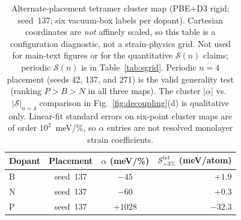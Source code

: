 \begin{table}[t]
\caption{\label{tab:placement}Alternate-placement tetramer cluster map (PBE+D3 rigid; seed~137; six vacuum-box labels per dopant). Cartesian coordinates are \emph{not} affinely scaled, so this table is a configuration diagnostic, not a strain-physics grid.
Not used for main-text figures or for the quantitative $\mathcal{S}(n)$ claims; periodic $\mathcal{S}(n)$ is in Table~\ref{tab:sgrid}. Periodic $n{=}4$ placement (seeds 42, 137, and 271) is the valid generality test (ranking $P{>}B{>}N$ in all three maps).
The cluster $|\alpha|$ vs.\ $|\mathcal{S}|_{n=4}$ comparison in Fig.~\ref{fig:decoupling}(d) is qualitative only.
Linear-fit standard errors on six-point cluster maps are of order $10^2$~meV/\%, so $\alpha$ entries are not resolved monolayer strain coefficients.}
\begin{ruledtabular}
\begin{tabular}{lccr}
Dopant & Placement & $\alpha$ (meV/\%) & $\mathcal{S}_{+3\%}^{\mathrm{tet}}$ (meV/atom) \\
\hline
B & seed~137 & $-45$ & $+1.9$ \\
N & seed~137 & $-60$ & $+0.3$ \\
P & seed~137 & $+1028$ & $-32.3$ \\
\end{tabular}
\end{ruledtabular}
\end{table}
